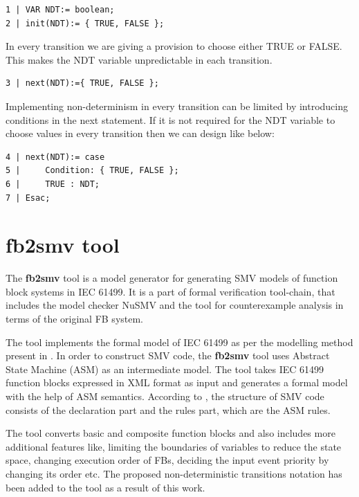 \documentclass[conference]{IEEEtran}
\begin{document}
\begin{lstlisting}[breaklines,basicstyle=\small]
1 | VAR NDT:= boolean;
2 | init(NDT):= { TRUE, FALSE };
\end{lstlisting}
 In every  transition we are giving a provision to choose either TRUE or FALSE. This makes the NDT variable unpredictable in each transition.
\begin{lstlisting}[breaklines,basicstyle=\small]
3 | next(NDT):={ TRUE, FALSE };
\end{lstlisting}
Implementing non-determinism in every transition can be limited by introducing conditions in the next statement. If it is not required for the NDT variable to choose values in every transition then we can design like below:
\begin{lstlisting}[breaklines,basicstyle=\small]
4 | next(NDT):= case
5 | 	Condition: { TRUE, FALSE };
6 |     TRUE : NDT;
7 | Esac;

\end{lstlisting}

\section {{fb2smv} tool}
The {\bf fb2smv} tool \cite{fb2smv} is a model generator for generating SMV models of function block systems in IEC 61499. It is a part of formal verification tool-chain, that includes the model checker NuSMV and the tool for counterexample analysis in terms of the original FB system. 

The tool implements the formal model of IEC 61499 as per the modelling method present in  \cite{drozdov2021formal}. In order to construct {SMV} code, the {\bf fb2smv} tool uses Abstract State Machine (ASM) \cite{gurevich1995evolving} as an intermediate model. The tool takes  IEC 61499 function blocks expressed in XML format as input and generates a formal model with the help of ASM semantics. According to \cite{drozdov2021formal}, the structure of {SMV} code consists of  the declaration part and the rules part, which are the ASM rules.


The tool converts basic and composite function blocks and also includes more additional features like, limiting the boundaries of variables to reduce the state space, changing execution order of FBs, deciding the input event priority by changing its order etc. The proposed non-deterministic transitions notation has been added to the tool as a result of this work. 
\end{document}
